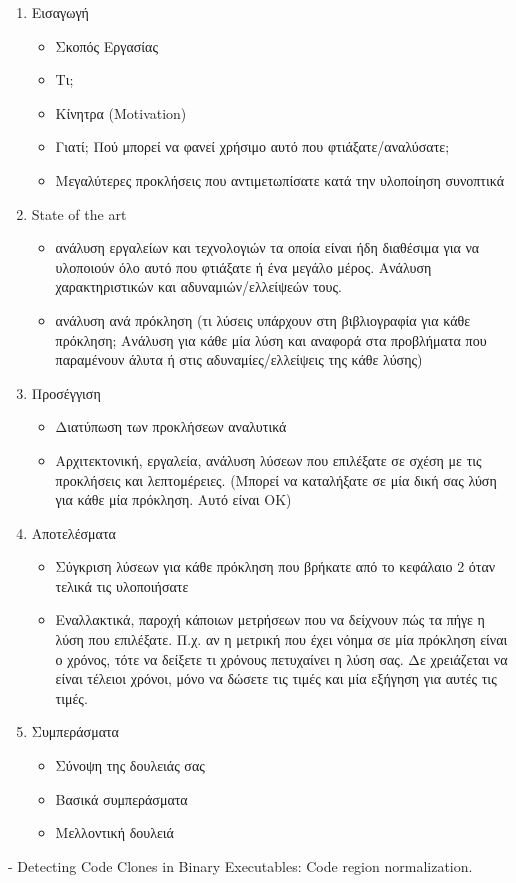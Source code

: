 \begin{enumerate}
    \item Εισαγωγή
    \begin{itemize}
        \item  Σκοπός Εργασίας
        \item Τι;
        \item Κίνητρα (Motivation)
        \item Γιατί; Πού μπορεί να φανεί χρήσιμο αυτό που φτιάξατε/αναλύσατε;
        \item Μεγαλύτερες προκλήσεις που αντιμετωπίσατε κατά την υλοποίηση συνοπτικά
    \end{itemize}
    \item  State of the art 
    \begin{itemize}
        \item ανάλυση εργαλείων και τεχνολογιών τα οποία είναι ήδη διαθέσιμα για να υλοποιούν όλο αυτό που φτιάξατε ή ένα μεγάλο μέρος. Ανάλυση χαρακτηριστικών και αδυναμιών/ελλείψεών τους.
        \item ανάλυση ανά πρόκληση (τι λύσεις υπάρχουν στη βιβλιογραφία για κάθε πρόκληση; Ανάλυση για κάθε μία λύση και αναφορά στα προβλήματα που παραμένουν άλυτα ή στις αδυναμίες/ελλείψεις της κάθε λύσης)
    \end{itemize}
    \item Προσέγγιση
    \begin{itemize}
        \item Διατύπωση των προκλήσεων αναλυτικά
        \item Αρχιτεκτονική, εργαλεία, ανάλυση λύσεων που επιλέξατε σε σχέση με τις προκλήσεις και λεπτομέρειες. (Μπορεί να καταλήξατε σε μία δική σας λύση για κάθε μία πρόκληση. Αυτό είναι ΟΚ)
    \end{itemize}
    
    \item  Αποτελέσματα
    \begin{itemize}
        \item  Σύγκριση λύσεων για κάθε πρόκληση που βρήκατε από το κεφάλαιο 2 όταν τελικά τις υλοποιήσατε
        \item Εναλλακτικά, παροχή κάποιων μετρήσεων που να δείχνουν πώς τα πήγε η λύση που επιλέξατε. Π.χ. αν η μετρική που έχει νόημα σε μία πρόκληση είναι ο χρόνος, τότε να δείξετε τι χρόνους πετυχαίνει η λύση σας. Δε χρειάζεται να είναι τέλειοι χρόνοι, μόνο να δώσετε τις τιμές και μία εξήγηση για αυτές τις τιμές.
    \end{itemize}
    \item  Συμπεράσματα
    \begin{itemize}
        \item Σύνοψη της δουλειάς σας
        \item Βασικά συμπεράσματα
        \item Μελλοντική δουλειά
    \end{itemize}
\end{enumerate}










 - Detecting Code Clones in Binary Executables: Code region normalization.
